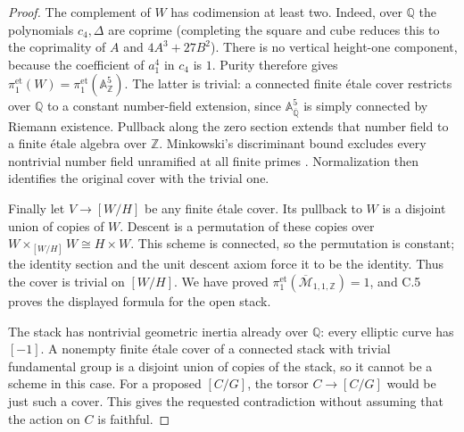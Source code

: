 \begin{proof}
The complement of $W$ has codimension at least two.
Indeed, over $\mathbb Q$ the polynomials $c_4,\Delta$ are
coprime (completing the square and cube reduces this to the
coprimality of $A$ and $4A^3+27B^2$). There is no vertical
height-one component, because the coefficient of $a_1^4$ in
$c_4$ is $1$. Purity therefore gives
$\pi_1^{\mathrm{et}}(W)=\pi_1^{\mathrm{et}}(\mathbb A^5_{\mathbb Z})$.
The latter is trivial: a connected finite \'etale cover restricts
over $\mathbb Q$ to a constant number-field extension, since
$\mathbb A^5_{\overline{\mathbb Q}}$ is simply connected by
Riemann existence. Pullback along the zero section extends
that number field to a finite \'etale algebra over $\mathbb Z$.
Minkowski's discriminant bound excludes every nontrivial
number field unramified at all finite primes
\citep[Theorems 4.3 and 4.9]{Milne2020ANT}. Normalization
then identifies the original cover with the trivial one.

Finally let $V\to[W/H]$ be any finite \'etale cover. Its
pullback to $W$ is a disjoint union of copies of $W$. Descent
is a permutation of these copies over
$W\times_{[W/H]}W\cong H\times W$. This scheme is connected,
so the permutation is constant; the identity section and
the unit descent axiom force it to be the identity.
Thus the cover is trivial on $[W/H]$. We have proved
$\pi_1^{\mathrm{et}}(\overline{\mathcal M}_{1,1,\mathbb Z})=1$,
and C.5 proves the displayed formula for the open stack.

The stack has nontrivial geometric inertia already over
$\mathbb Q$: every elliptic curve has $[-1]$. A nonempty
finite \'etale cover of a connected stack with trivial
fundamental group is a disjoint union of copies of the
stack, so it cannot be a scheme in this case. For a proposed
$[C/G]$, the torsor $C\to[C/G]$ would be just such a cover.
This gives the requested contradiction without assuming
that the action on $C$ is faithful.
\end{proof}

